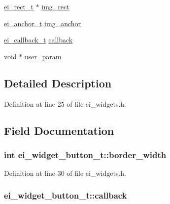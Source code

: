 \begin{DoxyCompactItemize}
\item 
\hyperlink{structei__rect__t}{ei\-\_\-rect\-\_\-t} $\ast$ \hyperlink{structei__widget__button__t_aa41be279677fbc141d0e7a8041afd936}{img\-\_\-rect}
\item 
\hyperlink{ei__types_8h_a3852c963af609d31d7cfcff79c4c8450}{ei\-\_\-anchor\-\_\-t} \hyperlink{structei__widget__button__t_a24dc795533f63d7759d2572b3899ca7c}{img\-\_\-anchor}
\item 
\hyperlink{ei__widget_8h_a52cc2158a16cbba536b8e25d2a5da712}{ei\-\_\-callback\-\_\-t} \hyperlink{structei__widget__button__t_ae676092d353684d49ff6fac56b965831}{callback}
\item 
void $\ast$ \hyperlink{structei__widget__button__t_a77f0c278c449eb8e90f6a7f8415ac882}{user\-\_\-param}
\end{DoxyCompactItemize}


\subsection{Detailed Description}


Definition at line 25 of file ei\-\_\-widgets.\-h.



\subsection{Field Documentation}
\hypertarget{structei__widget__button__t_a6bcd339f4094c369a4542e71dcd46ae6}{
\subsubsection[{border\-\_\-width}]{\setlength{\rightskip}{0pt plus 5cm}int ei\-\_\-widget\-\_\-button\-\_\-t\-::border\-\_\-width}}\label{structei__widget__button__t_a6bcd339f4094c369a4542e71dcd46ae6}


Definition at line 30 of file ei\-\_\-widgets.\-h.

\hypertarget{structei__widget__button__t_ae676092d353684d49ff6fac56b965831}{
\subsubsection[{callback}]{ ei\-\_\-widget\-\_\-button\-\_\-t\-::callback}}\label{structei__widget__button__t_ae676092d353684d49ff6fac56b965831}


